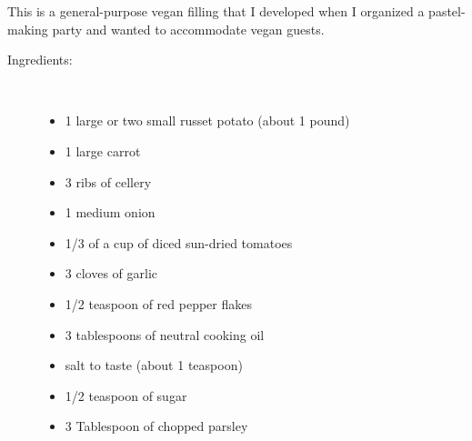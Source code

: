 \documentclass[11pt,letterpaper]{article}
\begin{document}


This is a general-purpose vegan filling that I developed when I organized a pastel-making party and wanted to accommodate vegan guests.
\begin{description}

\item[Ingredients:]\ \\
	\begin{itemize}
	\item 1 large or two small russet potato (about 1 pound)
	\item 1 large carrot
	\item 3 ribs of cellery
	\item 1 medium onion
	\item 1/3 of a cup of diced sun-dried tomatoes
	\item 3 cloves of garlic
	\item 1/2 teaspoon of red pepper flakes
	\item 3 tablespoons of neutral cooking oil
	\item salt to taste (about 1 teaspoon)
	\item 1/2 teaspoon of sugar
	\item 3 Tablespoon of chopped parsley
	\end{itemize}


\end{description}
\end{document}
